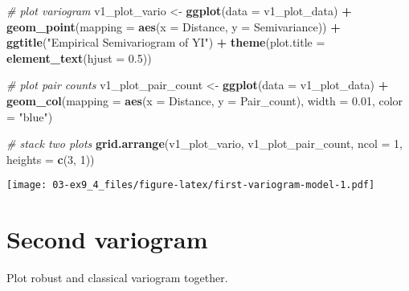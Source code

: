 \documentclass[]{book}
\newenvironment{Shaded}{\begin{snugshade}}{\end{snugshade}}
\newcommand{\CommentTok}[1]{\textcolor[rgb]{0.56,0.35,0.01}{\textit{#1}}}
\newcommand{\DataTypeTok}[1]{\textcolor[rgb]{0.13,0.29,0.53}{#1}}
\newcommand{\DecValTok}[1]{\textcolor[rgb]{0.00,0.00,0.81}{#1}}
\newcommand{\FloatTok}[1]{\textcolor[rgb]{0.00,0.00,0.81}{#1}}
\newcommand{\KeywordTok}[1]{\textcolor[rgb]{0.13,0.29,0.53}{\textbf{#1}}}
\newcommand{\NormalTok}[1]{#1}
\newcommand{\OperatorTok}[1]{\textcolor[rgb]{0.81,0.36,0.00}{\textbf{#1}}}
\newcommand{\StringTok}[1]{\textcolor[rgb]{0.31,0.60,0.02}{#1}}
\begin{document}
\begin{Shaded}
\begin{Highlighting}[]
\CommentTok{# plot variogram}
\NormalTok{v1_plot_vario <-}\StringTok{ }\KeywordTok{ggplot}\NormalTok{(}\DataTypeTok{data =}\NormalTok{ v1_plot_data) }\OperatorTok{+}
\StringTok{  }\KeywordTok{geom_point}\NormalTok{(}\DataTypeTok{mapping =} \KeywordTok{aes}\NormalTok{(}\DataTypeTok{x =}\NormalTok{ Distance, }\DataTypeTok{y =}\NormalTok{ Semivariance)) }\OperatorTok{+}
\StringTok{  }\KeywordTok{ggtitle}\NormalTok{(}\StringTok{"Empirical Semivariogram of YI"}\NormalTok{) }\OperatorTok{+}
\StringTok{  }\KeywordTok{theme}\NormalTok{(}\DataTypeTok{plot.title =} \KeywordTok{element_text}\NormalTok{(}\DataTypeTok{hjust =} \FloatTok{0.5}\NormalTok{))}

\CommentTok{# plot pair counts}
\NormalTok{v1_plot_pair_count <-}\StringTok{ }\KeywordTok{ggplot}\NormalTok{(}\DataTypeTok{data =}\NormalTok{ v1_plot_data) }\OperatorTok{+}
\StringTok{  }\KeywordTok{geom_col}\NormalTok{(}\DataTypeTok{mapping =} \KeywordTok{aes}\NormalTok{(}\DataTypeTok{x =}\NormalTok{ Distance, }\DataTypeTok{y =}\NormalTok{ Pair_count), }\DataTypeTok{width =} \FloatTok{0.01}\NormalTok{, }\DataTypeTok{color =} \StringTok{"blue"}\NormalTok{)}

\CommentTok{# stack two plots}
\KeywordTok{grid.arrange}\NormalTok{(v1_plot_vario, v1_plot_pair_count,}
             \DataTypeTok{ncol =} \DecValTok{1}\NormalTok{, }\DataTypeTok{heights =} \KeywordTok{c}\NormalTok{(}\DecValTok{3}\NormalTok{, }\DecValTok{1}\NormalTok{))}
\end{Highlighting}
\end{Shaded}

\texttt{[image: 03-ex9\_4\_files/figure-latex/first-variogram-model-1.pdf]}

\hypertarget{second-variogram}{%
\section{Second variogram}\label{second-variogram}}

Plot robust and classical variogram together.

\begin{Shaded}
\end{Shaded}
\end{document}
